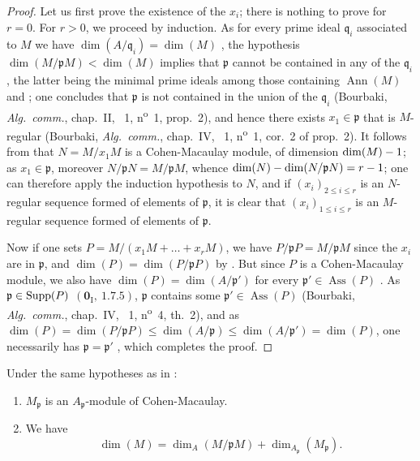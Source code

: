 \begin{proof}
Let us first prove the existence of the $x_i$; there is nothing to prove for $r=0$.
For $r>0$, we proceed by induction.
As for every prime ideal $\mathfrak{q}_i$ associated to $M$ we have $\dim(A/\mathfrak{q}_i)=\dim(M)$ , the hypothesis $\dim(M/\mathfrak{p}M)<\dim(M)$ implies that $\mathfrak{p}$ cannot be contained in any of the $\mathfrak{q}_i$, the latter being the minimal prime ideals among those containing $\operatorname{Ann}(M)$  and ; one concludes that $\mathfrak{p}$ is not contained in the union of the $\mathfrak{q}_i$ (Bourbaki, \emph{Alg.~comm.}, chap.~II, \textsection~1, n\textsuperscript{o}~1, prop.~2), and hence there exists $x_1\in\mathfrak{p}$ that is $M$-regular (Bourbaki, \emph{Alg.~comm.}, chap.~IV, \textsection~1, n\textsuperscript{o}~1, cor.~2 of prop.~2).
It follows from  that $N=M/x_1M$ is a Cohen-Macaulay module, of dimension $\dim(M)- 1$; as $x_1\in\mathfrak{p}$, moreover $N/\mathfrak{p}N=M/\mathfrak{p}M$, whence $\dim(N)-\dim(N/\mathfrak{p}N)=r- 1$; one can therefore apply the induction hypothesis to $N$, and if $(x_i)_{2\leq i\leq r}$ is an $N$-regular sequence formed of elements of $\mathfrak{p}$, it is clear that $(x_i)_{1\leq i\leq r}$ is an $M$-regular sequence formed of elements of $\mathfrak{p}$.

Now if one sets $P=M/(x_1M+\ldots+x_r M)$, we have $P/\mathfrak{p}P=M/\mathfrak{p}M$ since the $x_i$ are in $\mathfrak{p}$, and $\dim(P)=\dim(P/\mathfrak{p}P)$ by .
But since $P$ is a Cohen-Macaulay module, we also have $\dim(P)=\dim(A/\mathfrak{p}')$ for every $\mathfrak{p}'\in\operatorname{Ass}(P)$ .
As $\mathfrak{p}\in\operatorname{Supp}(P)$ $(\mathbf{0}_\mathrm{I},~1.7.5)$, $\mathfrak{p}$ contains some $\mathfrak{p}'\in\operatorname{Ass}(P)$ (Bourbaki, \emph{Alg.~comm.}, chap.~IV, \textsection~1, n\textsuperscript{o}~4, th.~2), and as $\dim(P)=\dim(P/\mathfrak{p}P)\leq\dim(A/\mathfrak{p})\leq\dim(A/\mathfrak{p}')=\dim(P)$, one necessarily has $\mathfrak{p}=\mathfrak{p}'$ , which completes the proof.
\end{proof}

\begin{corollary}[16.5.10]
\label{0.16.5.10}
Under the same hypotheses as in :
\begin{enumerate}
  \item[\rm{(i)}] $M_\mathfrak{p}$ is an $A_\mathfrak{p}$-module of Cohen-Macaulay.
  \item[\rm{(ii)}] We have
  \begin{equation}
  \label{0.16.5.10.1}
  \tag{16.5.10.1}
    \dim(M)=\dim_A(M/\mathfrak{p}M)+\dim_{A_\mathfrak{p}}(M_\mathfrak{p}).
  \end{equation}
\end{enumerate}
\end{corollary}

